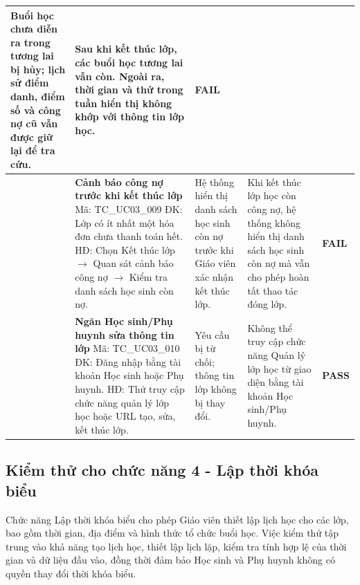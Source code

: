 \begin{longtable}{|>{\centering\arraybackslash}p{0.8cm}|>{\raggedright\arraybackslash}p{4.6cm}|>{\raggedright\arraybackslash}p{3.8cm}|>{\raggedright\arraybackslash}p{3.8cm}|>{\centering\arraybackslash}p{1.5cm}|}
Buổi học chưa diễn ra trong tương lai bị hủy; lịch sử điểm danh, điểm số và công nợ cũ vẫn được giữ lại để tra cứu. &
Sau khi kết thúc lớp, các buổi học tương lai vẫn còn. Ngoài ra, thời gian và thứ trong tuần hiển thị không khớp với thông tin lớp học. & \textbf{FAIL} \\
\hline
9 & \textbf{Cảnh báo công nợ trước khi kết thúc lớp}\newline
Mã: TC\_UC03\_009\newline
ĐK: Lớp có ít nhất một hóa đơn chưa thanh toán hết.\newline
HĐ: Chọn Kết thúc lớp $\rightarrow$ Quan sát cảnh báo công nợ $\rightarrow$ Kiểm tra danh sách học sinh còn nợ. &
Hệ thống hiển thị danh sách học sinh còn nợ trước khi Giáo viên xác nhận kết thúc lớp. &
Khi kết thúc lớp học còn công nợ, hệ thống không hiển thị danh sách học sinh còn nợ mà vẫn cho phép hoàn tất thao tác đóng lớp. & \textbf{FAIL} \\
\hline
10 & \textbf{Ngăn Học sinh/Phụ huynh sửa thông tin lớp}\newline
Mã: TC\_UC03\_010\newline
ĐK: Đăng nhập bằng tài khoản Học sinh hoặc Phụ huynh.\newline
HĐ: Thử truy cập chức năng quản lý lớp học hoặc URL tạo, sửa, kết thúc lớp. &
Yêu cầu bị từ chối; thông tin lớp không bị thay đổi. &
Không thể truy cập chức năng Quản lý lớp học từ giao diện bằng tài khoản Học sinh/Phụ huynh. & \textbf{PASS} \\
\hline
\end{longtable}

\vspace{0.8em}
\subsection{Kiểm thử cho chức năng 4 - Lập thời khóa biểu}

\hspace*{1em}Chức năng Lập thời khóa biểu cho phép Giáo viên thiết lập lịch học cho các lớp, bao gồm thời gian, địa điểm và hình thức tổ chức buổi học. Việc kiểm thử tập trung vào khả năng tạo lịch học, thiết lập lịch lặp, kiểm tra tính hợp lệ của thời gian và dữ liệu đầu vào, đồng thời đảm bảo Học sinh và Phụ huynh không có quyền thay đổi thời khóa biểu.

